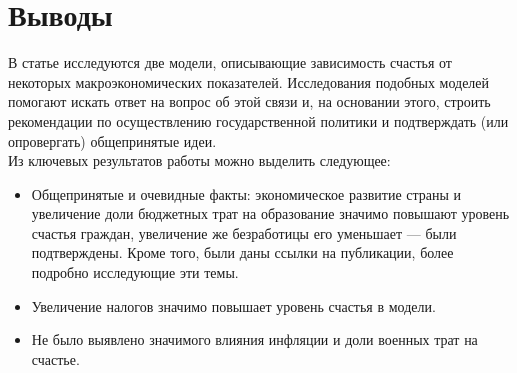 \documentclass[russian]{vegareport}
\begin{document}
    
    \chapter{Выводы}
        В статье исследуются две модели, описывающие зависимость счастья от некоторых макроэкономических показателей. Исследования подобных моделей помогают искать ответ на вопрос об этой связи и, на основании этого, строить рекомендации по осуществлению государственной политики и подтверждать (или опровергать) общепринятые идеи.
        \\
        Из ключевых результатов работы можно выделить следующее:
        \begin{itemize}
            \item Общепринятые и очевидные факты: экономическое развитие страны и увеличение доли бюджетных трат на образование значимо повышают уровень счастья граждан, увеличение же безработицы его уменьшает --- были подтверждены. Кроме того, были даны ссылки на публикации, более подробно исследующие эти темы.
            \item Увеличение налогов значимо повышает уровень счастья в модели.
            \item Не было выявлено значимого влияния инфляции и доли военных трат на счастье.
        \end{itemize}
        
\end{document}
